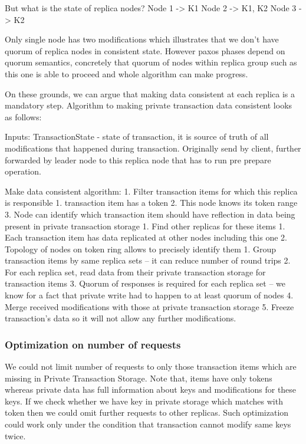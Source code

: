 But what is the state of replica nodes?
Node 1 -> { K1 }
Node 2 -> { K1, K2 }
Node 3 -> { K2 }


Only single node has two modifications which illustrates that we don’t have quorum of replica nodes in consistent state. However paxos phases depend on quorum semantics, concretely that quorum of nodes within replica group such as this one is able to proceed and whole algorithm can make progress. 


On these grounds, we can argue that making data consistent at each replica is a mandatory step.
Algorithm to making private transaction data consistent looks as follows:


Inputs:
        TransactionState - state of transaction, it is source of truth of all modifications that happened during transaction. Originally send by client, further forwarded by leader node to this replica node that has to run pre prepare operation.


        Make data consistent algorithm:        
1. Filter transaction items for which this replica is responsible
   1. transaction item has a token
   2. This node knows its token range
   3. Node can identify which transaction item should have reflection in data being present in private transaction storage
1. Find other replicas for these items
   1. Each transaction item has data replicated at other nodes including this one
   2. Topology of nodes on token ring allows to precisely identify them
1. Group transaction items by same replica sets -- it can reduce number of round trips
2. For each replica set, read data from their private transaction storage for transaction items
3. Quorum of responses is required for each replica set -- we know for a fact that private write had to happen to at least quorum of nodes
4. Merge received modifications with those at private transaction storage
5. Freeze transaction’s data so it will not allow any further modifications.


\subsubsection{Optimization on number of requests}
We could not limit number of requests to only those transaction items which are missing in Private Transaction Storage. Note that, items have only tokens whereas private data has full information about keys and modifications for these keys. If we check whether we have key in private storage which matches with token then we could omit further requests to other replicas. 
Such optimization could work only under the condition that transaction cannot modify same keys twice. 


